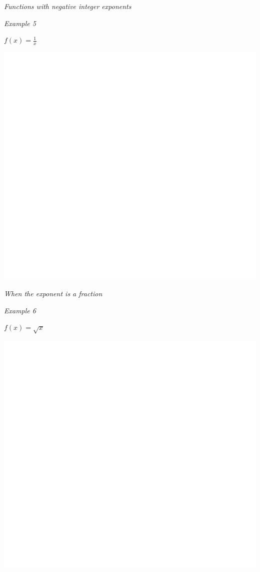 \documentclass[]{book}
\begin{document}
\emph{Functions with negative integer exponents}

\emph{Example 5}

\(f(x)=\frac{1}{x}\)

\begin{center}\includegraphics[width=1\linewidth]{figure/LB8-1} \end{center}

\emph{When the exponent is a fraction}

\emph{Example 6}

\(f(x)=\sqrt{x}\)

\begin{center}\includegraphics[width=1\linewidth]{figure/LB9-1} \end{center}
\end{document}
